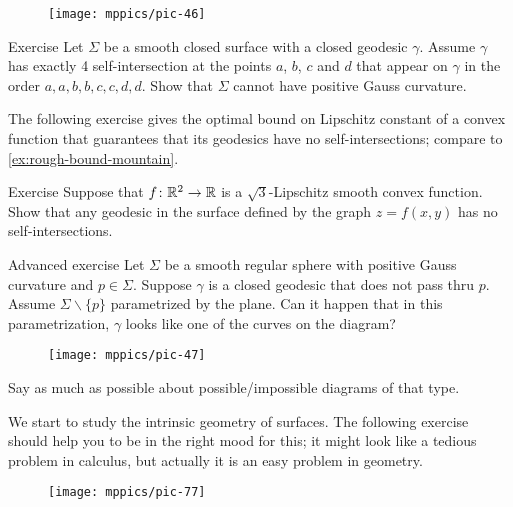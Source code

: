 {

\begin{wrapfigure}[4]{r}{25 mm}
\vskip-8mm
\centering
\texttt{[image: mppics/pic-46]}
\vskip-0mm
\end{wrapfigure}

\begin{thm}{Exercise}\label{ex:aabbccdd}
Let $\Sigma$ be a smooth closed surface with a closed geodesic $\gamma$.
Assume $\gamma$ has exactly 4 self-intersection at the points $a$, $b$, $c$ and $d$ that appear on $\gamma$ in the order $a,a,b,b,c,c,d,d$.
Show that $\Sigma$ cannot have positive Gauss curvature.
\end{thm}

The following exercise gives the optimal bound on Lipschitz constant of a convex function that guarantees that its geodesics have no self-intersections;
compare to \ref{ex:rough-bound-mountain}.

\begin{thm}{Exercise}\label{ex:sqrt(3)}
Suppose that $f\colon\mathbb{R}^2\to\mathbb{R}$ is a $\sqrt{3}$-Lipschitz smooth convex function.
Show that any geodesic in the surface defined by the graph $z=f(x,y)$ has no self-intersections.
\end{thm}

\begin{thm}{Advanced exercise}\label{ex:self-intersections}
Let $\Sigma$ be a smooth regular sphere with positive Gauss curvature and $p\in\Sigma$. 
Suppose $\gamma$ is a closed geodesic that does not pass thru $p$.
Assume $\Sigma\backslash\{p\}$ parametrized by the plane.
Can it happen that in this parametrization,  $\gamma$ looks like one of the curves on the diagram?
\begin{figure}[h!]
\vskip-0mm
\centering
\texttt{[image: mppics/pic-47]}
\vskip-0mm
\end{figure}
Say as much as possible about possible/impossible diagrams of that type.
\end{thm}

}


We start to study the intrinsic geometry of surfaces.
The following exercise should help you to be in the right mood for this;
it might look like a tedious problem in calculus, but actually it is an easy problem in geometry.

\begin{wrapfigure}{r}{33 mm}
\vskip-0mm
\centering
\texttt{[image: mppics/pic-77]}
\vskip-0mm
\end{wrapfigure}

